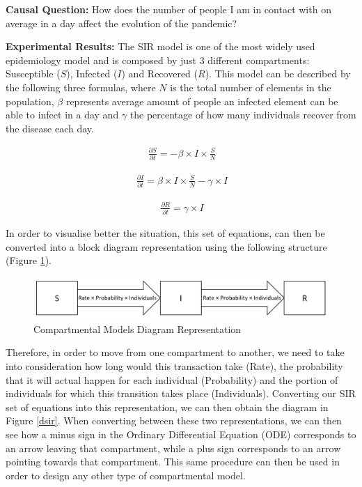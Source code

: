 \textbf{Causal Question:} How does the number of people I am in contact with on average in a day affect the evolution of the pandemic?

\textbf{Experimental Results:} The SIR model is one of the most widely used epidemiology model and is composed by just 3 different compartments: Susceptible ($S$), Infected ($I$) and Recovered ($R$). This model can be described by the following three formulas, where 
$N$ is the total number of elements in the population, $\beta$ represents average amount of people an infected element can be able to infect in a day and
$\gamma$ the percentage of how many individuals recover from the disease each day.

\useshortskip
\begin{align}
\ \frac{\partial S}{\partial t} = -\beta \times I \times \frac{S}{N}
\end{align}
\useshortskip

\useshortskip
\begin{align}
\ \frac{\partial I}{\partial t} = \beta \times I \times \frac{S}{N} -\gamma \times I
\end{align}
\useshortskip

\useshortskip
\begin{align}
\ \frac{\partial R}{\partial t} = \gamma \times I
\end{align}
\useshortskip

In order to visualise better the situation, this set of equations, can then be converted into a block diagram representation using the following structure (Figure \ref{comp}).

\begin{figure}[ht!]%
    \centering
    \includegraphics[width=0.8\linewidth]{latex/images/comp.pdf}
    \caption{Compartmental Models Diagram Representation}
    \label{comp}
\end{figure}

Therefore, in order to move from one compartment to another, we need to take into consideration how long would this transaction take (Rate), the probability that it will actual happen for each individual (Probability) and the portion of individuals for which this transition takes place (Individuals). Converting our SIR set of equations into this representation, we can then obtain the diagram in Figure \ref{dsir}. When converting between these two representations, we can then see how a minus sign in the Ordinary Differential Equation (ODE) corresponds to an arrow leaving that compartment, while a plus sign corresponds to an arrow pointing towards that compartment. This same procedure can then be used in order to design any other type of compartmental model.

